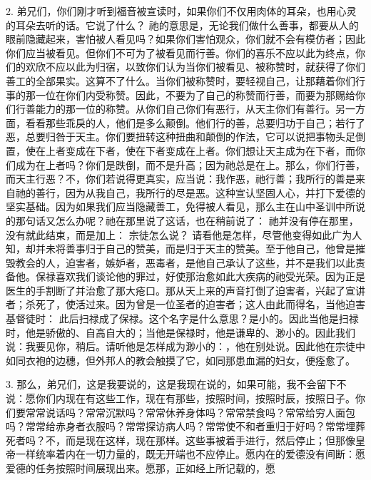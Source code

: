 2. 弟兄们，你们刚才听到福音被宣读时，如果你们不仅用肉体的耳朵，也用心灵的耳朵去听的话。它说了什么？ 祂的意思是，无论我们做什么善事，都要从人的眼前隐藏起来，害怕被人看见吗？如果你们害怕观众，你们就不会有模仿者；因此你们应当被看见。但你们不可为了被看见而行善。你们的喜乐不应以此为终点，你们的欢欣不应以此为归宿，以致你们认为当你们被看见、被称赞时，就获得了你们善工的全部果实。这算不了什么。当你们被称赞时，要轻视自己，让那藉着你们行事的那一位在你们内受称赞。因此，不要为了自己的称赞而行善，而要为那赐给你们行善能力的那一位的称赞。从你们自己你们有恶行，从天主你们有善行。另一方面，看看那些乖戾的人，他们是多么颠倒。他们行的善，总要归功于自己；若行了恶，总要归咎于天主。你们要扭转这种扭曲和颠倒的作法，它可以说把事物头足倒置，使在上者变成在下者，使在下者变成在上者。你们想让天主成为在下者，而你们成为在上者吗？你们是跌倒，而不是升高；因为祂总是在上。那么，你们行善，而天主行恶？不，你们若说得更真实，应当说：我作恶，祂行善；我所行的善是来自祂的善行，因为从我自己，我所行的尽是恶。这种宣认坚固人心，并打下爱德的坚实基础。因为如果我们应当隐藏善工，免得被人看见，那么主在山中圣训中所说的那句话又怎么办呢？祂在那里说了这话，也在稍前说了： 祂并没有停在那里，没有就此结束，而是加上： 宗徒怎么说？ 请看他是怎样，尽管他变得如此广为人知，却并未将善事归于自己的赞美，而是归于天主的赞美。至于他自己，他曾是摧毁教会的人，迫害者，嫉妒者，恶毒者，是他自己承认了这些，并不是我们以此责备他。保禄喜欢我们谈论他的罪过，好使那治愈如此大疾病的祂受光荣。因为正是医生的手割断了并治愈了那大疮口。那从天上来的声音打倒了迫害者，兴起了宣讲者；杀死了，使活过来。因为曾是一位圣者的迫害者；这人由此而得名，当他迫害基督徒时： 此后扫禄成了保禄。这个名字是什么意思？是小的。因此当他是扫禄时，他是骄傲的、自高自大的；当他是保禄时，他是谦卑的、渺小的。因此我们说：我要见你，稍后。请听他是怎样成为渺小的：，他在别处说。因此他在宗徒中如同衣袍的边穗，但外邦人的教会触摸了它，如同那患血漏的妇女，便痊愈了。\par

3. 那么，弟兄们，这是我要说的，这是我现在说的，如果可能，我不会留下不说：愿你们内现在有这些工作，现在有那些，按照时间，按照时辰，按照日子。你们要常常说话吗？常常沉默吗？常常休养身体吗？常常禁食吗？常常给穷人面包吗？常常给赤身者衣服吗？常常探访病人吗？常常使不和者重归于好吗？常常埋葬死者吗？不，而是现在这样，现在那样。这些事被着手进行，然后停止；但那像皇帝一样统率着内在一切力量的，既无开端也不应停止。愿内在的爱德没有间断：愿爱德的任务按照时间展现出来。愿那，正如经上所记载的，愿\par

